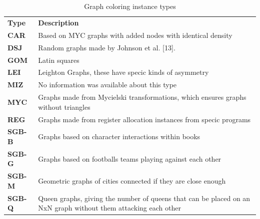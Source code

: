 \documentclass{sig-alternate}
\begin{document}
\section*{}
\begin{table}
\caption{Graph coloring instance types}
\label{my-label}
\begin{tabular}{ll}
\textbf{Type} & \textbf{Description} \\
\textbf{CAR}   & Based on MYC graphs with added nodes with identical density                                                    \\
\textbf{DSJ}   & Random graphs made by Johnson et al. {[}13{]}.                                                                 \\
\textbf{GOM}   & Latin squares                                                                                                  \\
\textbf{LEI}   & Leighton Graphs, these have specic kinds of asymmetry                                                          \\
\textbf{MIZ}   & No information was available about this type                                                                   \\
\textbf{MYC}   & Graphs made from Mycielski transformations, which ensures graphs without triangles                             \\
\textbf{REG}   & Graphs made from register allocation instances from specic programs                                           \\
\textbf{SGB-B} & Graphs based on character interactions within books                                                            \\
\textbf{SGB-G} & Graphs based on footballs teams playing against each other                                                     \\
\textbf{SGB-M} & Geometric graphs of cities connected if they are close enough                                                  \\
\textbf{SGB-Q} & Queen graphs, giving the number of queens that can be placed on an NxN graph without them attacking each other
\end{tabular}
\end{table}

\section*{}
\end{document}
